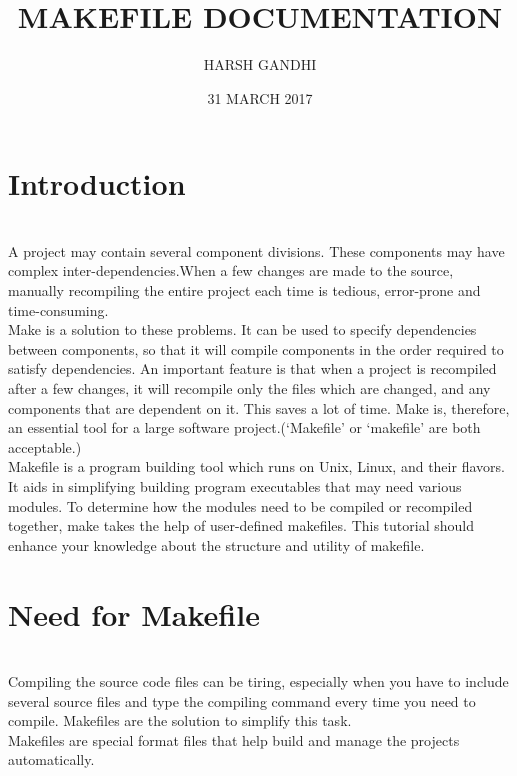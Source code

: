 \documentclass[12pt, a4paper, twoside]{report}
\title{\textbf {\Huge MAKEFILE DOCUMENTATION}}
\author{\rmfamily \huge HARSH GANDHI}
\date{31 MARCH 2017}
\begin{document}
 
\begin{titlepage}
\maketitle
\end{titlepage}

\section{{Introduction}}
    \\
   \large
   { A project may contain several component divisions. These components may have complex    inter-dependencies.When a few changes are made to the source, manually recompiling the entire project each time is tedious, error-prone and time-consuming.\\

	Make is a solution to these problems. It can be used to specify dependencies between components, so that it will compile components in the order required to satisfy dependencies. An important feature is that when a project is recompiled after a few changes, it will recompile only the files which are changed, and any components that are dependent on it. This saves a lot of time. Make is, therefore, an essential tool for a large software project.(‘Makefile’ or ‘makefile’ are both acceptable.)\\

	Makefile is a program building tool which runs on Unix, Linux, and their flavors. It aids in simplifying building program executables that may need various modules. To determine how the modules need to be compiled or recompiled together, make takes the help of user-defined makefiles. This tutorial should enhance your knowledge about the structure and utility of makefile.}	
\section{{Need for Makefile}}
    \\
    \large
    { Compiling the source code files can be tiring, especially when you have to include several source files and type the compiling command every time you need to compile. Makefiles are the solution to simplify this task.\\

    Makefiles are special format files that help build and manage the projects automatically.\\}   
\end{document}
